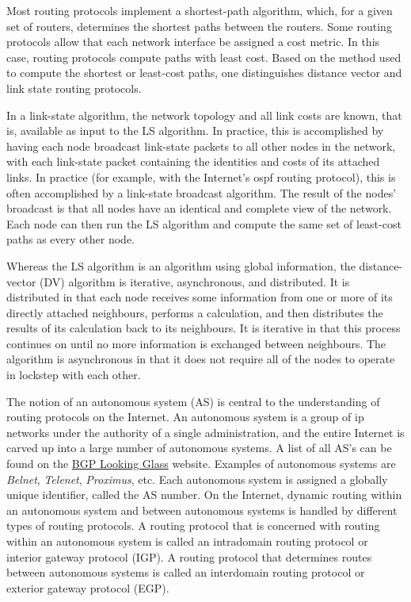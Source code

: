 Most routing protocols implement a shortest-path algorithm, which, for a given set of routers, determines the shortest paths between the routers. Some routing protocols allow that each network interface be assigned a cost metric. In this case, routing protocols compute paths with least cost. Based on the method used to compute the shortest or least-cost paths, one distinguishes distance vector and link state routing protocols.

In a link-state algorithm, the network topology and all link costs are known, that is, available as input to the LS algorithm. In practice, this is accomplished by having each node broadcast link-state packets to all other nodes in the network, with each link-state packet containing the identities and costs of its attached links. In practice (for example, with the Internet's \acs{ospf} routing protocol), this is often accomplished by a link-state broadcast algorithm. The result of the nodes' broadcast is that all nodes have an identical and complete view of the network. Each node can then run the LS algorithm and compute the same set of least-cost paths as every other node.

Whereas the LS algorithm is an algorithm using global information, the distance-vector (DV) algorithm is iterative, asynchronous, and distributed. It is distributed in that each node receives some information from one or more of its directly attached neighbours, performs a calculation, and then distributes the results of its calculation back to its neighbours. It is iterative in that this process continues on until no more information is exchanged between neighbours. The algorithm is asynchronous in that it does not require all of the nodes to operate in lockstep with each other.


The notion of an autonomous system (AS) is central to the understanding of routing protocols on the Internet. An autonomous system is a group of \ac{ip} networks under the authority of a single administration, and the entire Internet is carved up into a large number of autonomous systems. A list of all AS's can be found on the \href{https://www.bgplookingglass.com/list-of-autonomous-system-numbers}{BGP Looking Glass} website. Examples of autonomous systems are \emph{Belnet}, \emph{Telenet}, \emph{Proximus}, etc. Each autonomous system is assigned a globally unique identifier, called the AS number. On the Internet, dynamic routing within an autonomous system and between autonomous systems is handled by different types of routing protocols. A routing protocol that is concerned with routing within an autonomous system is called an intradomain routing protocol or interior gateway protocol (IGP). A routing protocol that determines routes between autonomous systems is called an interdomain routing protocol or exterior gateway protocol (EGP).

